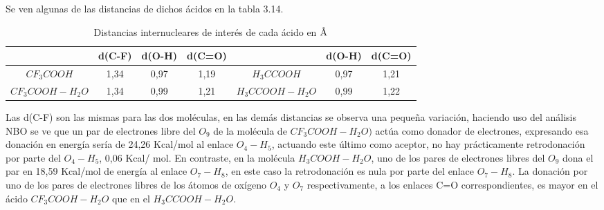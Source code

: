  Se ven algunas de las distancias de dichos ácidos en la tabla 3.14.
 \begin{table}[H]
 	\centering
 	\begin{tabular}{|c|c|c|c|c|c|c|}
 		\hline
 			 & d(C-F)	& d(O-H) & d(C=O) & & d(O-H) & d(C=O) \\ \hline
$CF_3COOH$ & 1,34 & 0,97 & 1,19 & $H_3CCOOH$ & 0,97 &1,21 \\ \hline $CF_3COOH-H_2O$	& 1,34 & 0,99 & 1,21 & $H_3CCOOH-H_2O$	& 0,99 &1,22 \\ \hline
 	\end{tabular}
 \caption{Distancias internucleares de interés de cada ácido en $\mbox{\normalfont\AA}$}
 \end{table}
Las d(C-F) son las mismas para las dos moléculas, en las demás distancias se observa una pequeña variación, haciendo uso del análisis NBO se ve que un par de electrones libre del $O_9$ de la molécula de $CF_3COOH-H_2O)$ actúa como donador de electrones, expresando esa donación en energía sería de 24,26 Kcal/mol al enlace $O_4-H_5$, actuando este último como aceptor, no hay prácticamente retrodonación por parte del $O_4-H_5$, 0,06 Kcal/ mol. En contraste, en la molécula $H_3COOH-H_2O$, uno de los pares de electrones libres del $O_9$ dona el par en 18,59 Kcal/mol de energía al enlace $O_7-H_8$, en este caso la retrodonación es nula por parte del enlace $O_7-H_8$. La donación por uno de los pares de electrones libres de los átomos de oxígeno $O_4$ y $O_7$ respectivamente, a los enlaces C=O correspondientes, es mayor en el ácido $CF_3COOH-H_2O$ que en el $H_3CCOOH-H_2O$.
